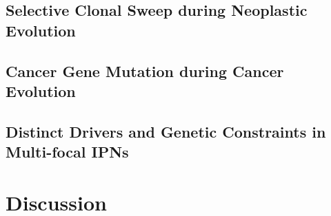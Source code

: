 \documentclass[a4paper]{article}
\begin{document}
        \subsection{Selective Clonal Sweep during Neoplastic Evolution}

        \subsection{Cancer Gene Mutation during Cancer Evolution}

        \subsection{Distinct Drivers and Genetic Constraints in Multi-focal IPNs}

    \section{Discussion}

    
    
\end{document}
